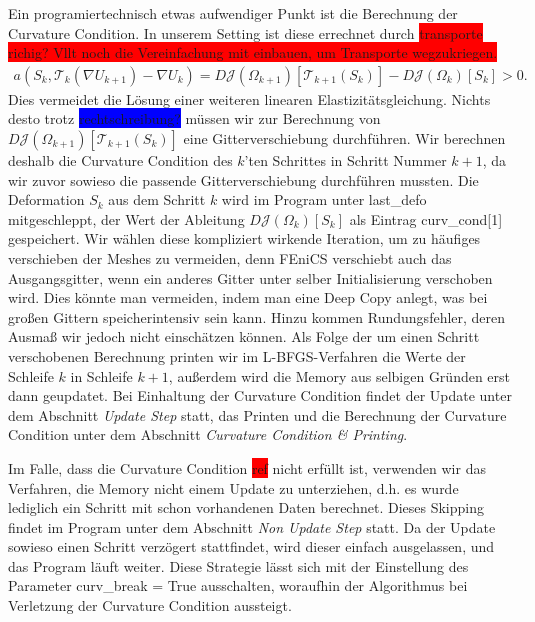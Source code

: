 Ein programiertechnisch etwas aufwendiger Punkt ist die Berechnung der Curvature Condition. In unserem Setting ist diese errechnet durch \colorbox{red}{transporte richig? Vllt noch die Vereinfachung mit einbauen, um Transporte wegzukriegen. }
\begin{align*}
	a(S_k, \mathcal{T}_k(\nabla U_{k+1}) - \nabla U_k) = D\mathcal{J}(\Omega_{k+1})[\mathcal{T}_{k+1}(S_k)] - D\mathcal{J}(\Omega_k)[S_k] > 0.
\end{align*}
Dies vermeidet die Lösung einer weiteren linearen Elastizitätsgleichung. Nichts desto trotz \colorbox{blue}{rechtschreibung?} müssen wir zur Berechnung von $D\mathcal{J}(\Omega_{k+1})[\mathcal{T}_{k+1}(S_k)]$ eine Gitterverschiebung durchführen. Wir berechnen deshalb die Curvature Condition des $k$'ten Schrittes in Schritt Nummer $k+1$, da wir zuvor sowieso die passende Gitterverschiebung durchführen mussten. Die Deformation $S_k$ aus dem Schritt $k$ wird im Program unter \textsf{last\_defo} mitgeschleppt, der Wert der Ableitung $D\mathcal{J}(\Omega_k)[S_k]$ als Eintrag \textsf{curv\_cond[1]} gespeichert. Wir wählen diese kompliziert wirkende Iteration, um zu häufiges verschieben der Meshes zu vermeiden, denn FEniCS verschiebt auch das Ausgangsgitter, wenn ein anderes Gitter unter selber Initialisierung verschoben wird. Dies könnte man vermeiden, indem man eine Deep Copy anlegt, was bei großen Gittern speicherintensiv sein kann. Hinzu kommen Rundungsfehler, deren Ausmaß wir jedoch nicht einschätzen können.
Als Folge der um einen Schritt verschobenen Berechnung printen wir im L-BFGS-Verfahren die Werte der Schleife $k$ in Schleife $k+1$, außerdem wird die Memory aus selbigen Gründen erst dann geupdatet. Bei Einhaltung der Curvature Condition findet der Update unter dem Abschnitt \textit{Update Step} statt, das Printen und die Berechnung der Curvature Condition unter dem Abschnitt \textit{Curvature Condition \& Printing}. 

Im Falle, dass die Curvature Condition \colorbox{red}{ref} nicht erfüllt ist, verwenden wir das Verfahren, die Memory nicht einem Update zu unterziehen, d.h. es wurde lediglich ein Schritt mit schon vorhandenen Daten berechnet. Dieses Skipping findet im Program unter dem Abschnitt \textit{Non Update Step} statt. Da der Update sowieso einen Schritt verzögert stattfindet, wird dieser einfach ausgelassen, und das Program läuft weiter. Diese Strategie lässt sich mit der Einstellung des Parameter \textsf{curv\_break = True} ausschalten, woraufhin der Algorithmus bei Verletzung der Curvature Condition aussteigt.


